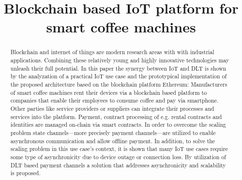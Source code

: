 \documentclass[conference]{IEEEtran}
\begin{document}
\title{Blockchain based IoT platform for smart coffee machines}

\author{

  \and


  \and

}

\maketitle

\begin{abstract}
Blockchain and internet of things are modern research areas with with industrial applications. Combining these relatively young and highly innovative technologies may unleash their full potential. In this paper the synergy between IoT and DLT is shown by the analyzation of a practical IoT use case and the prototypical implementation of the proposed architecture based on the blockchain platform Ethereum: Manufacturers of smart coffee machines rent their devices via a blockchain based platform to companies that enable their employees to consume coffee and pay via smartphone. Other parties like service providers or suppliers can integrate their processes and services into the platform. Payment, contract processing of e.g. rental contracts and identities are managed on-chain via smart contracts. In order to overcome the scaling problem state channels---more precisely payment channels---are utilized to enable asynchronous communication and allow offline payment. In addition, to solve the scaling problem in this use case's context, it is shown that many IoT use cases require some type of asynchronicity due to device outage or connection loss. By utilization of DLT based payment channels a solution that addresses asynchronicity and scalability is proposed.
\end{abstract}
\end{document}
